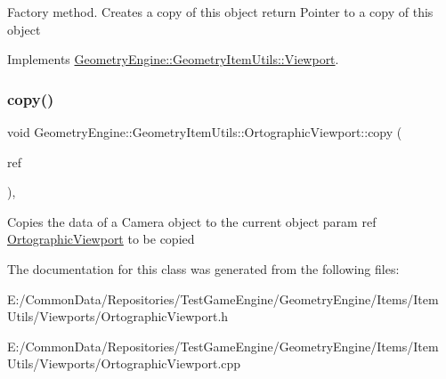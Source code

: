 Factory method. Creates a copy of this object return Pointer to a copy of this object 

Implements \mbox{\hyperlink{class_geometry_engine_1_1_geometry_item_utils_1_1_viewport_a8bd47866a001eae03f88df67fd699904}{Geometry\+Engine\+::\+Geometry\+Item\+Utils\+::\+Viewport}}.

\mbox{\label{class_geometry_engine_1_1_geometry_item_utils_1_1_ortographic_viewport_a01e153a7802a6593e0336464e3d8d3af}} 
\subsubsection{\texorpdfstring{copy()}{copy()}}
{\footnotesize\ttfamily void Geometry\+Engine\+::\+Geometry\+Item\+Utils\+::\+Ortographic\+Viewport\+::copy (\begin{DoxyParamCaption}\item[{const \mbox{\hyperlink{class_geometry_engine_1_1_geometry_item_utils_1_1_ortographic_viewport}{Ortographic\+Viewport}} \&}]{ref }\end{DoxyParamCaption})\hspace{0.3cm}{\ttfamily [protected]}, {\ttfamily [virtual]}}

Copies the data of a Camera object to the current object param ref \mbox{\hyperlink{class_geometry_engine_1_1_geometry_item_utils_1_1_ortographic_viewport}{Ortographic\+Viewport}} to be copied 

The documentation for this class was generated from the following files\+:\begin{DoxyCompactItemize}
\item 
E\+:/\+Common\+Data/\+Repositories/\+Test\+Game\+Engine/\+Geometry\+Engine/\+Items/\+Item Utils/\+Viewports/Ortographic\+Viewport.\+h\item 
E\+:/\+Common\+Data/\+Repositories/\+Test\+Game\+Engine/\+Geometry\+Engine/\+Items/\+Item Utils/\+Viewports/Ortographic\+Viewport.\+cpp\end{DoxyCompactItemize}
